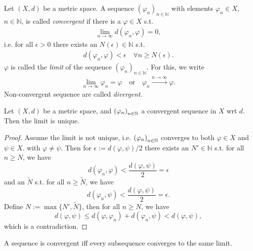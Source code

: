 \begin{defn}\label{defn:convergence_sequence}
	Let $(X, d)$ be a metric space. A sequence $(\varphi_n)_{n\in\mathbb N}$ with elements $\varphi_n\in X$, $n\in\mathbb N$, is called \textit{convergent} if there is a $\varphi\in X$ s.t.
	\begin{align}
		\lim\limits_{n\to\infty}d(\varphi_n, \varphi) = 0,
	\end{align}
	i.e. for all $\epsilon > 0$ there exists an $N(\epsilon)\in\mathbb N$ s.t.
	\begin{align}
		d(\varphi_n, \varphi) < \epsilon \quad \forall n\geq N(\epsilon).
	\end{align}
	$\varphi$ is called the \textit{limit} of the sequence $(\varphi_n)_{n\in \mathbb N}$. For this, we write 
	\begin{align}
		\lim\limits_{n\to\infty}\varphi_n = \varphi \quad \text{or}\quad \varphi_n \overset{n \to\infty}{\longrightarrow} \varphi.
	\end{align}
	Non-convergent sequence are called \textit{divergent}.
\end{defn}

\begin{theorem}\label{thrm:sequences_unique_limits}
	Let $(X, d)$ be a metric space, and $\seq[\varphi_n]$ a convergent sequence in $X$ wrt $d$. Then the limit is unique.
\end{theorem}

\begin{proof}
	Assume the limit is not unique, i.e. $\seq[\varphi_n]$ converges to both $\varphi\in X$ and $\psi\in X$. with $\varphi\ne\psi$. Then for $\epsilon := d(\varphi, \psi) / 2$ there exists an $N'\in\mathbb N$ s.t. for all $n\geq N$, we have
	$$d(\varphi_n, \varphi) < \frac{d(\varphi, \psi)}{2} = \epsilon$$ 
	and an $\tilde{N}$ s.t. for all $n\geq \tilde{N}$, we have
	$$d(\varphi_n, \psi) < \frac{d(\varphi, \psi)}{2} = \epsilon.$$
	Define $N := \max\{N', \tilde{N}\}$, then for all $n\geq N$, we have
	$$d(\varphi, \psi) \leq d(\varphi, \varphi_n) + d(\varphi_n, \psi) < d(\varphi, \psi),$$
	which is a contradiction.
\end{proof}

\begin{theorem}\label{thrm:seq_convergence_subsequences}
	A sequence is convergent iff every subsequence converges to the same limit.
\end{theorem}

